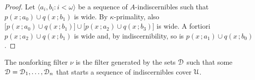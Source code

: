 \documentclass{amsproc}
\begin{document}
\begin{proof}
  Let $\langle a_i,b_i: i<\omega\rangle$ be a sequence of $A$-indiscernibles such that $p(x\,;a_0)\cup q(x\,;b_1)$ is wide.
  By $\kappa$-primality, also $\big[p(x\,;a_0)\cup q(x\,;b_1)\big]\cup\big[p(x\,;a_2)\cup q(x\,;b_3)\big]$ is wide.
  A fortiori $p(x\,;a_2)\cup q(x\,;b_1)$ is wide and, by indiscernibility, so is $p(x\,;a_1)\cup q(x\,;b_0)$.
\end{proof}

\begin{definition}
  The nonforking filter $\nu$ is the filter generated by the sets $\EuScript D$ such that some $\EuScript D=\EuScript D_1,\dots,\EuScript D_n$ that starts a sequence of indiscernibles cover $\EuScript U$.
\end{definition}
\end{document}
